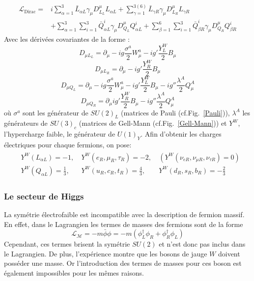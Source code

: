 \begin{equation}
\begin{split}
\mathcal{L}_{\mathrm{Dirac}}=&i\sum_{\alpha=1}^{3}\bar{L}_{\alpha L}\gamma_{\mu}D_{L_{L}}^{\mu}L_{\alpha L}+\sum_{\gamma=1}^{3(6)}\bar{L}_{\gamma R}\gamma_{\mu}D_{L_{R}}^{\mu}L_{\gamma R}\\
&+\sum_{\alpha=1}^{3}\sum_{i=1}^{3}\bar{Q}_{\alpha L}^{i}\gamma_{\mu}D_{Q_{L}}^{\mu}Q_{\alpha L}^{i}+\sum_{\beta=1}^{6}\sum_{i=1}^{3}\bar{Q}_{\beta R}^{i}\gamma_{\mu}D_{Q_{R}}^{\mu}Q_{\beta R}^{i}
\end{split}
\end{equation}
Avec les dérivées covariantes de la forme : 
\begin{equation}
D_{\mu L_{L}}=\partial_{\mu} -ig\frac{\sigma^a}{2}W_{\mu}^{a}-ig'\frac{Y^{W}_{L}}{2}B_{\mu}
\end{equation}
\begin{equation}
D_{\mu L_{R}}=\partial_{\mu} -ig'\frac{Y^{W}_{R}}{2}B_{\mu}
\end{equation}
\begin{equation}
D_{\mu Q_{L}}=\partial_{\mu} -ig\frac{\sigma^a}{2}W_{\mu}^{a}-ig'\frac{Y^{W}_{L}}{2}B_{\mu}-ig''\frac{\lambda^{A}}{2}Q_{\mu}^{A}
\end{equation}
\begin{equation}
D_{\mu Q_{R}}=\partial_{\mu}ig'\frac{Y^{W}_{R}}{2}B_{\mu}-ig''\frac{\lambda^{A}}{2}Q_{\mu}^{A}
\end{equation}
où $\sigma^{a}$ sont les générateur de $SU(2)_{L}$ (matrices de Pauli (cf.Fig.~\ref{Pauli})), $\lambda^{A}$ les générateurs de $SU(3)_{c}$ (matrices de Gell-Mann (cf.Fig.~\ref{Gell-Mann})) et $Y^{W}$, l'hypercharge faible, le générateur de $U(1)_{Y}$. 
Afin d'obtenir les charges électriques pour chaque fermions, on pose:
\begin{multline}
\begin{split}
&Y^W(L_{\alpha L})=-1,\ &Y^W(e_{R},\mu_{R},\tau_{R})=-2,\ &\left(Y^W(\nu_{e R},\nu_{\mu R},\nu_{\tau R})=0\right)\\
&Y^W(Q_{\alpha L})=\frac{1}{3},\ &Y^W(u_{R},c_{R},t_{R})=\frac{4}{3},\ &Y^W(d_{R},s_{R},b_{R})=-\frac{2}{3}
\end{split}
\end{multline}  


\subsubsection{Le secteur de Higgs} 
La symétrie électrofaible est incompatible avec la description de fermion massif. En effet, dans le Lagrangien les termes de masses des fermions sont de la forme 
\begin{equation}
\mathcal{L_{M}}=-m\bar{\phi}\phi=-m \left(\phi_{L}^{\dagger}\phi_{R}+\phi_{R}^{\dagger}\phi_{L}\right)
\end{equation}
Cependant, ces termes brisent la symétrie $SU(2)$ et n'est donc pas inclus dans le Lagrangien. De plus, l'expérience montre que les bosons de jauge $W$ doivent posséder une masse. Or l'introduction des termes de masses pour ces boson est également impossibles pour les mêmes raisons.


